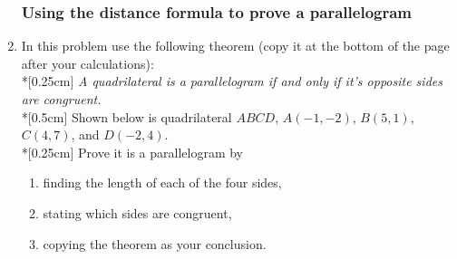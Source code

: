 \documentclass[12pt, twoside]{article}
\begin{document}
\begin{enumerate}
\subsubsection*{Using the distance formula to prove a parallelogram}
  \item In this problem use the following theorem (copy it at the bottom of the page after your calculations): \\*[0.25cm]
  \emph{A quadrilateral is a parallelogram if and only if it's opposite sides are congruent.}\\*[0.5cm]
  Shown below is quadrilateral $ABCD$, $A(-1,-2)$, $B(5,1)$, $C(4,7)$, and $D(-2,4)$. \\*[0.25cm]
  Prove it is a parallelogram by
  \begin{enumerate}
    \item finding the length of each of the four sides,
    \item stating which sides are congruent,
    \item copying the theorem as your conclusion.
  \end{enumerate}
  \begin{flushright} %
  \end{flushright}

\end{enumerate}
\end{document}
